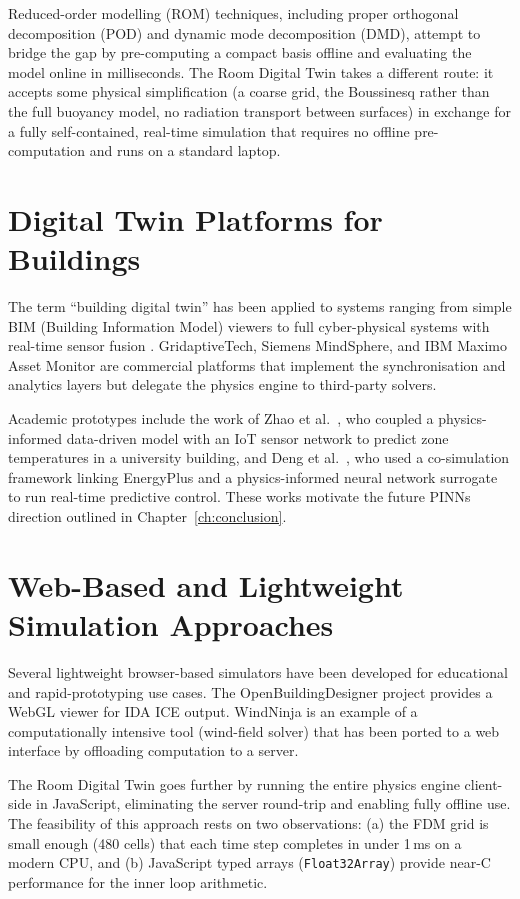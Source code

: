 \documentclass[12pt,a4paper]{report}
\begin{document}
Reduced-order modelling (ROM) techniques, including proper orthogonal decomposition (POD) \cite{pod2002} and dynamic mode decomposition (DMD), attempt to bridge the gap by pre-computing a compact basis offline and evaluating the model online in milliseconds. The Room Digital Twin takes a different route: it accepts some physical simplification (a coarse grid, the Boussinesq rather than the full buoyancy model, no radiation transport between surfaces) in exchange for a fully self-contained, real-time simulation that requires no offline pre-computation and runs on a standard laptop.

\section{Digital Twin Platforms for Buildings}
\label{sec:dt_platforms}

The term ``building digital twin'' has been applied to systems ranging from simple BIM (Building Information Model) viewers to full cyber-physical systems with real-time sensor fusion \cite{sepasgozar2021}. GridaptiveTech, Siemens MindSphere, and IBM Maximo Asset Monitor are commercial platforms that implement the synchronisation and analytics layers but delegate the physics engine to third-party solvers.

Academic prototypes include the work of Zhao et al.\ \cite{zhao2020}, who coupled a physics-informed data-driven model with an IoT sensor network to predict zone temperatures in a university building, and Deng et al.\ \cite{deng2022}, who used a co-simulation framework linking EnergyPlus and a physics-informed neural network surrogate to run real-time predictive control. These works motivate the future PINNs direction outlined in Chapter~\ref{ch:conclusion}.

\section{Web-Based and Lightweight Simulation Approaches}
\label{sec:web_sims}

Several lightweight browser-based simulators have been developed for educational and rapid-prototyping use cases. The OpenBuildingDesigner project \cite{obd2018} provides a WebGL viewer for IDA ICE output. WindNinja \cite{forthofer2014} is an example of a computationally intensive tool (wind-field solver) that has been ported to a web interface by offloading computation to a server.

The Room Digital Twin goes further by running the entire physics engine client-side in JavaScript, eliminating the server round-trip and enabling fully offline use. The feasibility of this approach rests on two observations: (a) the FDM grid is small enough (480 cells) that each time step completes in under 1\,ms on a modern CPU, and (b) JavaScript typed arrays (\texttt{Float32Array}) provide near-C performance for the inner loop arithmetic.
\end{document}
